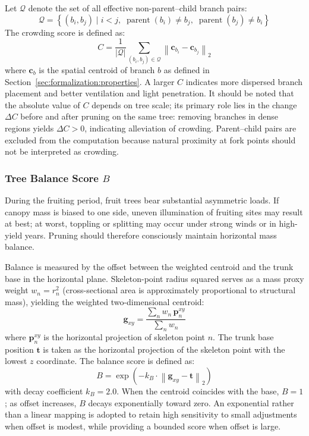 \documentclass[12pt,a4paper,fontset=fandol]{ctexart}
\newcommand{\cb}[1][b]{\mathbf{c}_{#1}}
\begin{document}
Let $\mathcal{Q}$ denote the set of all effective non-parent--child branch pairs:
\begin{equation}\label{eq:branch_pair_set}
\mathcal{Q} = \left\{(b_i, b_j) \mid i < j,\;
  \operatorname{parent}(b_i) \neq b_j,\;
  \operatorname{parent}(b_j) \neq b_i \right\}
\end{equation}
The crowding score is defined as:
\begin{equation}\label{eq:crowding}
  C = \frac{1}{|\mathcal{Q}|} \sum_{(b_i, b_j) \in \mathcal{Q}}
      \left\| \cb[b_i] - \cb[b_j] \right\|_2
\end{equation}
where $\cb[b]$ is the spatial centroid of branch $b$ as defined in Section~\ref{sec:formalization:properties}.
A larger $C$ indicates more dispersed branch placement and better ventilation and light penetration.
It should be noted that the absolute value of $C$ depends on tree scale;
its primary role lies in the change $\Delta C$ before and after pruning on the same tree:
removing branches in dense regions yields $\Delta C > 0$, indicating alleviation of crowding.
Parent--child pairs are excluded from the computation
because natural proximity at fork points should not be interpreted as crowding.

\subsubsection{Tree Balance Score $B$}

During the fruiting period, fruit trees bear substantial asymmetric loads.
If canopy mass is biased to one side, uneven illumination of fruiting sites may result at best;
at worst, toppling or splitting may occur under strong winds or in high-yield years.
Pruning should therefore consciously maintain horizontal mass balance.

Balance is measured by the offset between the weighted centroid and the trunk base in the horizontal plane.
Skeleton-point radius squared serves as a mass proxy weight $w_n = r_n^2$
(cross-sectional area is approximately proportional to structural mass), yielding the weighted two-dimensional centroid:
\begin{equation}\label{eq:balance_centroid}
  \mathbf{g}_{xy} = \frac{\sum_{n} w_n \, \mathbf{p}_n^{xy}}{\sum_{n} w_n}
\end{equation}
where $\mathbf{p}_n^{xy}$ is the horizontal projection of skeleton point $n$.
The trunk base position $\mathbf{t}$ is taken as the horizontal projection of the skeleton point with the lowest $z$ coordinate.
The balance score is defined as:
\begin{equation}\label{eq:balance}
  B = \exp\!\left(-k_B \cdot \left\| \mathbf{g}_{xy} - \mathbf{t} \right\|_2 \right)
\end{equation}
with decay coefficient $k_B = 2.0$.
When the centroid coincides with the base, $B = 1$; as offset increases, $B$ decays exponentially toward zero.
An exponential rather than a linear mapping is adopted
to retain high sensitivity to small adjustments when offset is modest,
while providing a bounded score when offset is large.
\end{document}
